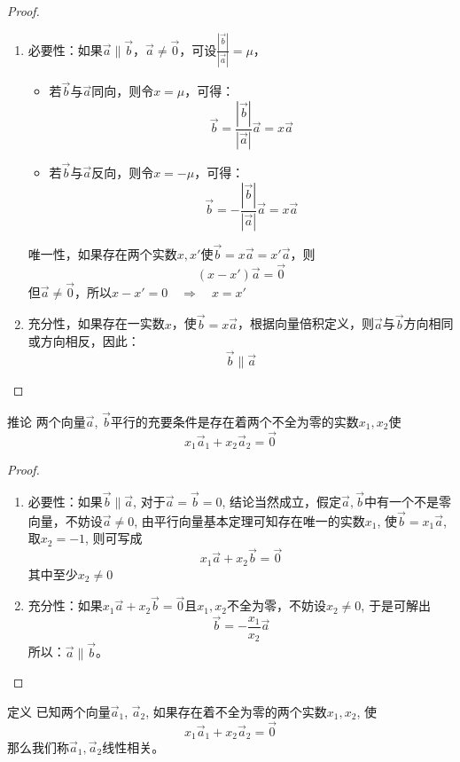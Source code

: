 \begin{proof}
\begin{enumerate}
    \item 必要性：如果$\vec{a}\parallel \vec{b}$，$\vec{a}\ne \vec{0}$，可设$\frac{|\vec{b}|}{|\vec{a}|}=\mu$，
\begin{itemize}
    \item 若$\vec{b}$与$\vec{a}$同向，则令$x=\mu$，可得：
\[\vec{b}=\frac{|\vec{b}|}{|\vec{a}|}\vec{a}=x\vec{a}\]
    \item  若$\vec{b}$与$\vec{a}$反向，则令$x=-\mu$，可得：
\[\vec{b}=-\frac{|\vec{b}|}{|\vec{a}|}\vec{a}=x\vec{a}\]
\end{itemize}

唯一性，如果存在两个实数$x,x'$使$\vec{b}=x\vec{a}=x'\vec{a}$，则
\[(x-x')\vec{a}=\vec{0}\]
但$\vec{a}\ne \vec{0}$，所以$x-x'=0\quad \Rightarrow\quad x=x'$

\item 充分性，如果存在一实数$x$，使$\vec{b}=x\vec{a}$，根据向量倍积定义，则$\vec{a}$与$\vec{b}$方向相同或方向相反，因此：
\[\vec{b}\parallel \vec{a}\]
\end{enumerate}
\end{proof}

\begin{blk}
{推论} 两个向量$\vec{a}$, $\vec{b}$平行的充要条件是存在着两个不全为零的实数$x_1,x_2$使
\[x_1\vec{a}_1+x_2\vec{a}_2=\vec{0}\]
\end{blk}

\begin{proof}
\begin{enumerate}
    \item 必要性：如果$\vec{b}\parallel \vec{a}$, 对于$\vec{a}=\vec{b}=0$, 结论当然成立，假定$\vec{a}, \vec{b}$中有一个不是零向量，不妨设$\vec{a}\ne 0$, 由平行向量基本定理可知存在唯一的实数$x_1$, 使$\vec{b}=x_1\vec{a}$, 取$x_2=-1$, 则可写成
    \[x_1\vec{a}+x_2\vec{b}=\vec{0}\]
其中至少$x_2\ne 0$
\item 充分性：如果$x_1\vec{a}+x_2\vec{b}=\vec{0}$且$x_1,x_2$不全为零，不妨设$x_2\ne 0$, 于是可解出
\[\vec{b}=-\frac{x_1}{x_2}\vec{a}\]
所以：$\vec{a}\parallel \vec{b}$。
\end{enumerate}
\end{proof}

\begin{blk}
    {定义} 已知两个向量$\vec{a}_1$, $\vec{a}_2$, 如果存在着不全为零的两个实数$x_1,x_2$, 使
    \[x_1\vec{a}_1+x_2\vec{a}_2=\vec{0}\]
那么我们称$\vec{a}_1,\vec{a}_2$线性相关。
\end{blk}

